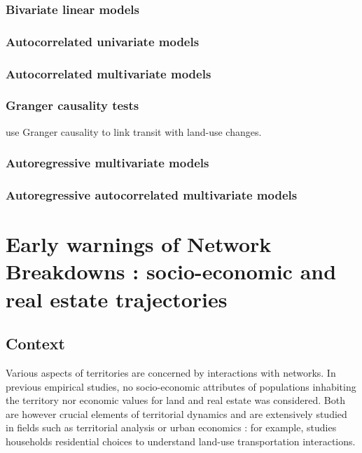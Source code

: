 \subsubsection{Bivariate linear models}

\subsubsection{Autocorrelated univariate models}

\subsubsection{Autocorrelated multivariate models}

\subsubsection{Granger causality tests}

\cite{xie2009streetcars} use Granger causality to link transit with land-use changes.


\subsubsection{Autoregressive multivariate models}



\subsubsection{Autoregressive autocorrelated multivariate models}












\newpage

\section{Early warnings of Network Breakdowns : socio-economic and real estate trajectories}


\subsection{Context}

Various aspects of territories are concerned by interactions with networks. In previous empirical studies, no socio-economic attributes of populations inhabiting the territory nor economic values for land and real estate was considered. Both are however crucial elements of territorial dynamics and are extensively studied in fields such as territorial analysis or urban economics : for example, \cite{homocianu:tel-00359302} studies households residential choices to understand land-use transportation interactions.




